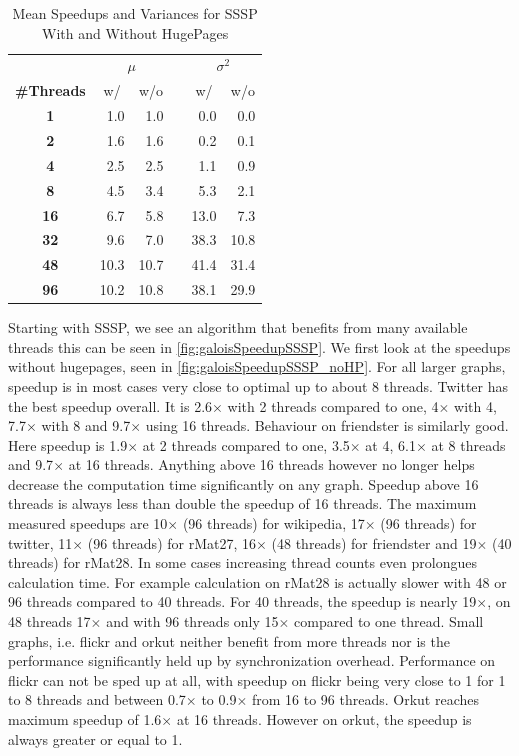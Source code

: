 \begin{table}
\renewcommand{\arraystretch}{1.3}
\centering
\caption{Mean Speedups and Variances for SSSP With and Without HugePages}
\label{tbl:ssspMeansVariances}
\begin{tabular}{c@{\hskip 2\tabcolsep}rrc@{\hskip 2\tabcolsep}rr}
\toprule
&\multicolumn{2}{c}{\!\!\!$\mu$}&\enspace&\multicolumn{2}{c}{\!\!$\sigma^2$}\\
\cmidrule(r){2-3}\cmidrule(r){5-6}
{\bf\#Threads}&\multicolumn{1}{c}{w/}&\multicolumn{1}{c}{w/o}&\enspace&\multicolumn{1}{c}{w/}&\multicolumn{1}{c}{w/o}\\\midrule
\bf1 & 1.0 & 1.0 &\enspace& 0.0 & 0.0 \\
\bf2 & 1.6 & 1.6 &\enspace& 0.2 & 0.1 \\
\bf4 & 2.5 & 2.5 &\enspace& 1.1 & 0.9 \\
\bf8 & 4.5 & 3.4 &\enspace& 5.3 & 2.1 \\
\bf16 & 6.7 & 5.8 &\enspace& 13.0 & 7.3 \\
\bf32 & 9.6 & 7.0 &\enspace& 38.3 & 10.8 \\
\bf48 & 10.3 & 10.7 &\enspace& 41.4 & 31.4 \\
\bf96 & 10.2 & 10.8 &\enspace& 38.1 & 29.9 \\
\bottomrule
\end{tabular}
\end{table}

Starting with SSSP, we see an algorithm that benefits from many available threads this can be seen in \autoref{fig:galoisSpeedupSSSP}.
We first look at the speedups without hugepages, seen in \autoref{fig:galoisSpeedupSSSP_noHP}.
For all larger graphs, speedup is in most cases very close to optimal up to about 8 threads.
Twitter has the best speedup overall. It is 2.6$\times$ with 2 threads compared to one, 4$\times$ with 4, 7.7$\times$ with 8 and 9.7$\times$ using 16 threads.
Behaviour on friendster is similarly good. Here speedup is 1.9$\times$ at 2 threads compared to one, 3.5$\times$ at 4, 6.1$\times$ at 8 threads and 9.7$\times$ at 16 threads.
Anything above 16 threads however no longer helps decrease the computation time significantly on any graph. Speedup above 16 threads is always less than double the speedup of 16 threads. The maximum measured speedups are 10$\times$ (96 threads) for wikipedia, 17$\times$ (96 threads) for twitter, 11$\times$ (96 threads) for rMat27, 16$\times$ (48 threads) for friendster and 19$\times$ (40 threads) for rMat28.
In some cases increasing thread counts even prolongues calculation time. For example calculation on rMat28 is actually slower with 48 or 96 threads compared to 40 threads. For 40 threads, the speedup is nearly 19$\times$, on 48 threads 17$\times$ and with 96 threads only 15$\times$ compared to one thread.
Small graphs, i.e. flickr and orkut neither benefit from more threads nor is the performance significantly held up by synchronization overhead.
Performance on flickr can not be sped up at all, with speedup on flickr being very close to 1 for 1 to 8 threads and between 0.7$\times$ to 0.9$\times$ from 16 to 96 threads.
Orkut reaches maximum speedup of 1.6$\times$ at 16 threads. However on orkut, the speedup is always greater or equal to 1.

